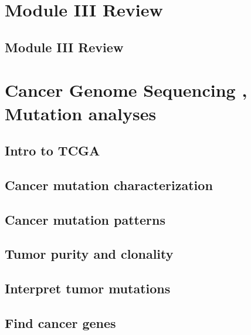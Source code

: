 \documentclass[
]{book}
\begin{document}
\hypertarget{m3re}{%
\chapter{Module III Review}\label{m3re}}

\hypertarget{module-iii-review}{%
\section{Module III Review}\label{module-iii-review}}

\hypertarget{cancerseq}{%
\chapter{Cancer Genome Sequencing , Mutation analyses}\label{cancerseq}}

\hypertarget{intro-to-tcga}{%
\section{Intro to TCGA}\label{intro-to-tcga}}

\hypertarget{cancer-mutation-characterization}{%
\section{Cancer mutation characterization}\label{cancer-mutation-characterization}}

\hypertarget{cancer-mutation-patterns}{%
\section{Cancer mutation patterns}\label{cancer-mutation-patterns}}

\hypertarget{tumor-purity-and-clonality}{%
\section{Tumor purity and clonality}\label{tumor-purity-and-clonality}}

\hypertarget{interpret-tumor-mutations}{%
\section{Interpret tumor mutations}\label{interpret-tumor-mutations}}

\hypertarget{find-cancer-genes}{%
\section{Find cancer genes}\label{find-cancer-genes}}
\end{document}
